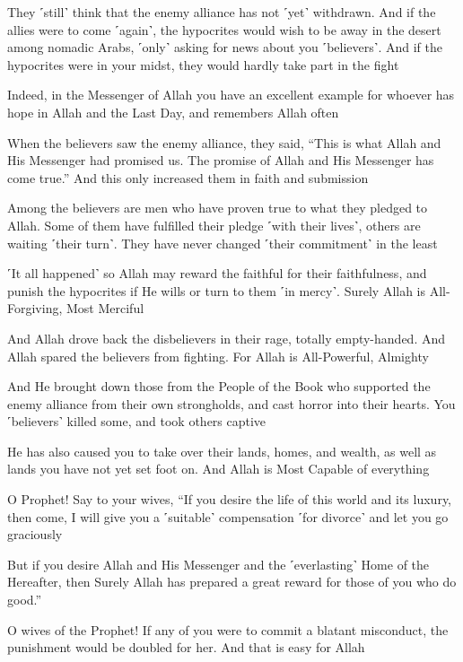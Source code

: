 They ˹still˺ think that the enemy alliance has not ˹yet˺ withdrawn. And if the allies were to come ˹again˺, the hypocrites would wish to be away in the desert among nomadic Arabs, ˹only˺ asking for news about you ˹believers˺. And if the hypocrites were in your midst, they would hardly take part in the fight

Indeed, in the Messenger of Allah you have an excellent example for whoever has hope in Allah and the Last Day, and remembers Allah often

When the believers saw the enemy alliance, they said, “This is what Allah and His Messenger had promised us. The promise of Allah and His Messenger has come true.” And this only increased them in faith and submission

Among the believers are men who have proven true to what they pledged to Allah. Some of them have fulfilled their pledge ˹with their lives˺, others are waiting ˹their turn˺. They have never changed ˹their commitment˺ in the least

˹It all happened˺ so Allah may reward the faithful for their faithfulness, and punish the hypocrites if He wills or turn to them ˹in mercy˺. Surely Allah is All-Forgiving, Most Merciful

And Allah drove back the disbelievers in their rage, totally empty-handed. And Allah spared the believers from fighting. For Allah is All-Powerful, Almighty

And He brought down those from the People of the Book who supported the enemy alliance from their own strongholds, and cast horror into their hearts. You ˹believers˺ killed some, and took others captive

He has also caused you to take over their lands, homes, and wealth, as well as lands you have not yet set foot on. And Allah is Most Capable of everything

O Prophet! Say to your wives, “If you desire the life of this world and its luxury, then come, I will give you a ˹suitable˺ compensation ˹for divorce˺ and let you go graciously

But if you desire Allah and His Messenger and the ˹everlasting˺ Home of the Hereafter, then Surely Allah has prepared a great reward for those of you who do good.”

O wives of the Prophet! If any of you were to commit a blatant misconduct, the punishment would be doubled for her. And that is easy for Allah

